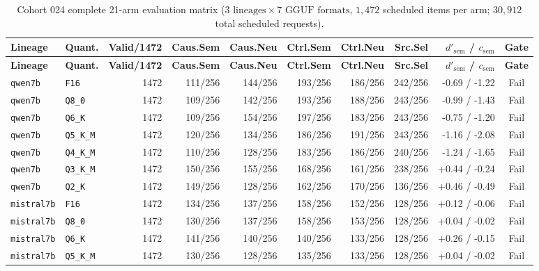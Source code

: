 {\scriptsize
\setlength{\tabcolsep}{3.2pt}
\begin{longtable}{@{}llrrrrrrrc@{}}
\caption{Cohort 024 complete 21-arm evaluation matrix ($3\text{ lineages}\times 7\text{ GGUF formats}$, $1{,}472$ scheduled items per arm; $30{,}912$ total scheduled requests).}\label{tab:c24_matrix}\\
\toprule
\textbf{Lineage} & \textbf{Quant.} & \textbf{Valid/1472} & \textbf{Caus.Sem} & \textbf{Caus.Neu} & \textbf{Ctrl.Sem} & \textbf{Ctrl.Neu} & \textbf{Src.Sel} & \textbf{$d'_{\text{sem}}$ / $c_{\text{sem}}$} & \textbf{Gate} \\
\midrule
\endfirsthead
\toprule
\textbf{Lineage} & \textbf{Quant.} & \textbf{Valid/1472} & \textbf{Caus.Sem} & \textbf{Caus.Neu} & \textbf{Ctrl.Sem} & \textbf{Ctrl.Neu} & \textbf{Src.Sel} & \textbf{$d'_{\text{sem}}$ / $c_{\text{sem}}$} & \textbf{Gate} \\
\midrule
\endhead
\bottomrule
\endfoot
\texttt{qwen7b} & \texttt{F16} & 1472 & 111/256 & 144/256 & 193/256 & 186/256 & 242/256 & -0.69 / -1.22 & Fail \\
\texttt{qwen7b} & \texttt{Q8\_0} & 1472 & 109/256 & 142/256 & 193/256 & 188/256 & 243/256 & -0.99 / -1.43 & Fail \\
\texttt{qwen7b} & \texttt{Q6\_K} & 1472 & 109/256 & 154/256 & 197/256 & 183/256 & 243/256 & -0.75 / -1.20 & Fail \\
\texttt{qwen7b} & \texttt{Q5\_K\_M} & 1472 & 120/256 & 134/256 & 186/256 & 191/256 & 243/256 & -1.16 / -2.08 & Fail \\
\texttt{qwen7b} & \texttt{Q4\_K\_M} & 1472 & 110/256 & 128/256 & 183/256 & 186/256 & 240/256 & -1.24 / -1.65 & Fail \\
\texttt{qwen7b} & \texttt{Q3\_K\_M} & 1472 & 150/256 & 155/256 & 168/256 & 161/256 & 238/256 & +0.44 / -0.24 & Fail \\
\texttt{qwen7b} & \texttt{Q2\_K} & 1472 & 149/256 & 128/256 & 162/256 & 170/256 & 136/256 & +0.46 / -0.49 & Fail \\
\texttt{mistral7b} & \texttt{F16} & 1472 & 134/256 & 137/256 & 158/256 & 152/256 & 128/256 & +0.12 / -0.06 & Fail \\
\texttt{mistral7b} & \texttt{Q8\_0} & 1472 & 130/256 & 137/256 & 158/256 & 153/256 & 128/256 & +0.04 / -0.02 & Fail \\
\texttt{mistral7b} & \texttt{Q6\_K} & 1472 & 141/256 & 140/256 & 140/256 & 133/256 & 128/256 & +0.26 / -0.15 & Fail \\
\texttt{mistral7b} & \texttt{Q5\_K\_M} & 1472 & 130/256 & 128/256 & 135/256 & 133/256 & 128/256 & +0.04 / -0.02 & Fail \\

\end{longtable}}
